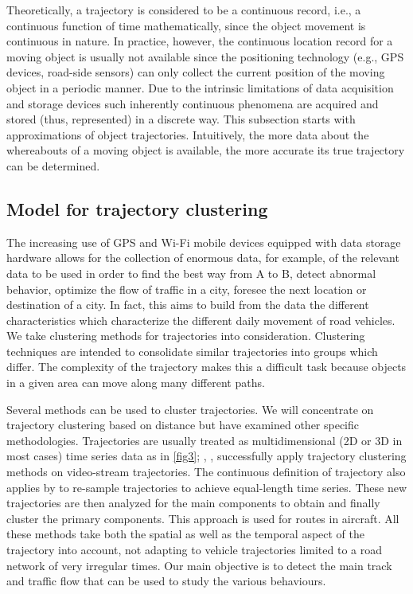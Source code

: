 \documentclass[a4paper, 12pt]{article}
\begin{document}
Theoretically, a trajectory is considered to be a continuous record, i.e., a continuous function of time mathematically, since the object movement is continuous in nature. In practice, however, the continuous location record for a moving object is usually not available since the positioning technology (e.g., GPS devices, road-side sensors) can only collect the current position of the moving object in a periodic manner. Due to the intrinsic limitations of data acquisition and storage devices such inherently continuous phenomena are acquired and stored (thus, represented) in a discrete way. This subsection starts with approximations of object trajectories. Intuitively, the more data about the whereabouts of a moving object is available, the more accurate its true trajectory can be determined.

\subsection{Model for trajectory clustering}
The increasing use of GPS and Wi-Fi mobile devices equipped with data storage hardware allows for the collection of enormous data, for example, of the relevant data to be used in order to find the best way from A to B, detect abnormal behavior, optimize the flow of traffic in a city, foresee the next location or destination of a city. In fact, this aims to build from the data the different characteristics which characterize the different daily movement of road vehicles. We take clustering methods for trajectories into consideration. Clustering techniques are intended to consolidate similar trajectories into groups which differ. The complexity of the trajectory makes this a difficult task because objects in a given area can move along many different paths. 

Several methods can be used to cluster trajectories. We will concentrate on trajectory clustering based on distance but have examined other specific methodologies. Trajectories are usually treated as multidimensional (2D or 3D in most cases) time series data as in \autoref{fig3}; \cite{gaffney1999trajectory}, \cite{vasquez2004motion}, \cite{hu2006system} successfully apply trajectory clustering methods on video-stream trajectories. The continuous definition of trajectory also applies by \cite{gariel2011trajectory} to re-sample trajectories to achieve equal-length time series. These new trajectories are then analyzed for the main components to obtain and finally cluster the primary components. This approach is used for routes in aircraft. All these methods take both the spatial as well as the temporal aspect of the trajectory into account, not adapting to vehicle trajectories limited to a road network of very irregular times. Our main objective is to detect the main track and traffic flow that can be used to study the various behaviours. 
\end{document}
